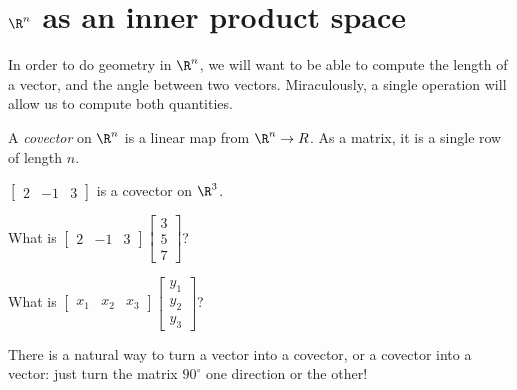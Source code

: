 
\section{$\R^n$ as an inner product space}
In order to do geometry in $\R^n$, we will want to be able to compute the length of a vector, and the angle between two vectors.   Miraculously, a single operation will allow us to
compute both quantities.

\begin{definition}
	A \textit{covector} on $\R^n$ is a linear map from $\R^n \to R$.  As a matrix, it is a single row of length $n$.
\end{definition}

\begin{example}
	$\begin{bmatrix} 2 & -1 & 3 \end{bmatrix}$ is a covector on $\R^3$.
\end{example}

\begin{question}
	What is $\begin{bmatrix} 2 & -1 & 3 \end{bmatrix} \begin{bmatrix} 3 \\5\\7 \end{bmatrix}$?
\end{question}

\begin{question}
	What is $\begin{bmatrix} x_1 & x_2 & x_3 \end{bmatrix} \begin{bmatrix} y_1 \\y_2\\y_3 \end{bmatrix}$?
\end{question}

There is a natural way to turn a vector into a covector, or a covector into a vector:  just turn the matrix $90^\circ$ one direction or the other!

